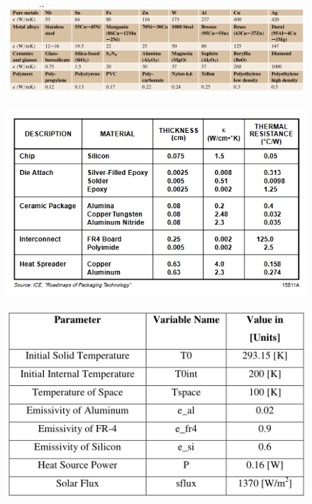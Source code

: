\documentclass[final]{cubedoc}
\begin{document}
	\begin{figure}[h!]
		\centering
		\includegraphics[width=\linewidth]{docs/table_properties_springer2.png}
		\caption{\cite[p.431]{kasap2017springer}}
		\label{fig:my_label}
	\end{figure}
	
	\begin{figure}[h!]
		\centering
		\includegraphics{docs/chip_properties.png}
		\caption{\cite[p.6-12]{chip}}
		\label{fig:my_label}
	\end{figure}
	
	\begin{figure}[h!]
		\centering
		\includegraphics[keepaspectratio, width=\textwidth]{docs/emissivity_silicon_fr4.png}
		\caption{\cite[p.41]{peake2014cubesat}}
		\label{fig:my_label}
	\end{figure}
	
\end{document}
